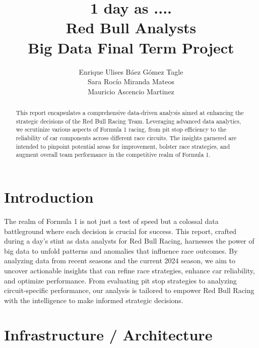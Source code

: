 \documentclass{article}
\begin{document}
\title{1 day as ....\\ Red Bull Analysts\\Big Data Final Term Project}

\author{Enrique Ulises Báez Gómez Tagle \\ Sara Rocío Miranda Mateos \\ Mauricio Ascencio Martinez}

\maketitle

\begin{abstract}
This report encapsulates a comprehensive data-driven analysis aimed at enhancing the strategic decisions of the Red Bull Racing Team. Leveraging advanced data analytics, we scrutinize various aspects of Formula 1 racing, from pit stop efficiency to the reliability of car components across different race circuits. The insights garnered are intended to pinpoint potential areas for improvement, bolster race strategies, and augment overall team performance in the competitive realm of Formula 1.
\end{abstract}

\tableofcontents
\newpage

\section{Introduction}
The realm of Formula 1 is not just a test of speed but a colossal data battleground where each decision is crucial for success. This report, crafted during a day's stint as data analysts for Red Bull Racing, harnesses the power of big data to unfold patterns and anomalies that influence race outcomes. By analyzing data from recent seasons and the current 2024 season, we aim to uncover actionable insights that can refine race strategies, enhance car reliability, and optimize performance. From evaluating pit stop strategies to analyzing circuit-specific performance, our analysis is tailored to empower Red Bull Racing with the intelligence to make informed strategic decisions.


\section{Infrastructure / Architecture}
\end{document}
